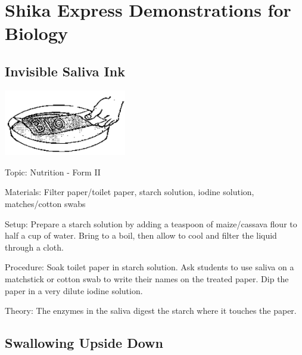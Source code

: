 \section{Shika Express Demonstrations for Biology}

\begin{multicols}{2}


\subsection{Invisible Saliva Ink} %

\begin{center}
\includegraphics[width=0.4\textwidth]{./img/source/saliva-ink.png}
\end{center}

\begin{description*}
\item[Topic:]{Nutrition - Form II}
\item[Materials:]{Filter paper/toilet paper, starch solution, iodine solution, matches/cotton swabs}
\item[Setup:]{Prepare a starch solution by adding a teaspoon of maize/cassava flour to half a
cup of water. Bring to a boil, then allow to cool and filter the liquid through a cloth.}
\item[Procedure:]{Soak toilet paper in starch solution. Ask students to use saliva on a matchstick or cotton swab to write their names on the treated paper. Dip the paper in a very dilute iodine solution.}
\item[Theory:]{The enzymes in the saliva digest the starch where it touches the paper.}
\end{description*}

\subsection{Swallowing Upside Down} %


\end{multicols}
